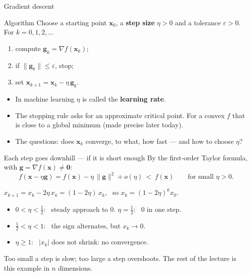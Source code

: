 \documentclass[10pt]{wosm-slides}
\newcommand{\norm}[1]{\lVert #1 \rVert}
\newcommand{\vx}{\mathbf{x}}
\newcommand{\vg}{\mathbf{g}}
\begin{document}
\begin{frame}{Gradient descent}
  \begin{block}{Algorithm}
    Choose a starting point $\vx_0$, a \textbf{step size} $\eta > 0$ and a tolerance $\varepsilon > 0$.
    For $k = 0, 1, 2, \dots$
    \begin{enumerate}
      \item compute $\vg_k = \nabla f(\vx_k)$;
      \item if $\norm{\vg_k} \le \varepsilon$, stop;
      \item set $\vx_{k+1} = \vx_k - \eta\, \vg_k$.
    \end{enumerate}
  \end{block}
  \pause
  \begin{itemize}
    \item In machine learning $\eta$ is called the \textbf{learning rate}.
    \item The stopping rule asks for an approximate critical point. For a convex $f$ that is
      close to a global minimum (made precise later today).
    \item The questions: does $\vx_k$ converge, to what, how fast --- and how to choose $\eta$?
  \end{itemize}
\end{frame}

\begin{frame}{Each step goes downhill --- if it is short enough}
  By the first-order Taylor formula, with $\vg = \nabla f(\vx) \ne \mathbf 0$:
  \[ f(\vx - \eta\vg) = f(\vx) - \eta\, \norm{\vg}^2 + o(\eta) \ <\ f(\vx)
     \qquad \text{for small } \eta > 0 . \]
  \pause
  \begin{example}[$f(x) = x^2$ in one variable]
    $x_{k+1} = x_k - 2\eta\, x_k = (1 - 2\eta)\, x_k$, \ so $x_k = (1 - 2\eta)^k x_0$.
    \begin{itemize}
      \item $0 < \eta < \frac12$: \ steady approach to $0$. \quad $\eta = \frac12$: \ $0$ in one step.
      \item $\frac12 < \eta < 1$: \ the sign alternates, but $x_k \to 0$.
      \item $\eta \ge 1$: \ $|x_k|$ does not shrink: no convergence.
    \end{itemize}
  \end{example}
  \pause
  {\small Too small a step is slow; too large a step overshoots. The rest of the lecture is this
  example in $n$ dimensions.\par}
\end{frame}
\end{document}
